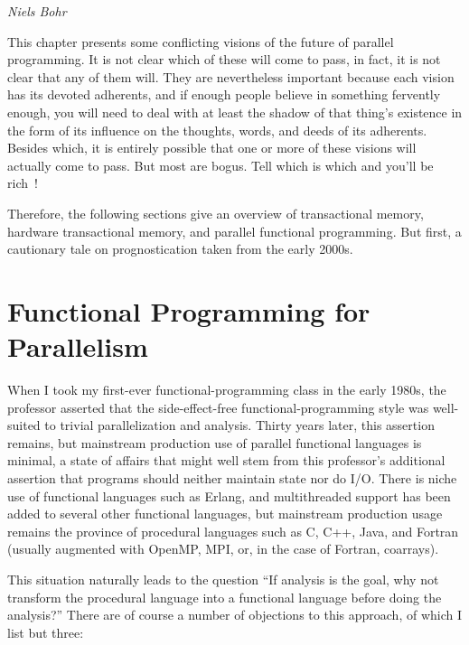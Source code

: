 
%
	 {\emph{Niels Bohr}}

This chapter presents some conflicting visions of the future of parallel
programming.
It is not clear which of these will come to pass, in fact, it is not
clear that any of them will.
They are nevertheless important because each vision has its devoted
adherents, and if enough people believe in something fervently enough,
you will need to deal with at least the shadow of that thing's existence
in the form of its
influence on the thoughts, words, and deeds of its adherents.
Besides which, it is entirely possible that one or more of these visions
will actually come to pass.
But most are bogus.
Tell which is which and you'll be rich~\cite{KeithRSpitz1977}!

Therefore, the following sections give an overview of transactional
memory, hardware transactional memory, and
parallel functional programming.
But first, a cautionary tale on prognostication taken from the early 2000s.





\section{Functional Programming for Parallelism}
\label{sec:future:Functional Programming for Parallelism}

When I took my first-ever functional-programming class in the early 1980s,
the professor asserted that the side-effect-free functional-programming
style was well-suited to trivial parallelization and analysis.
Thirty years later, this assertion remains, but mainstream production
use of parallel functional languages is minimal, a state of affairs
that might well stem from this professor's additional assertion that
programs should neither maintain state nor do I/O.
There is niche use of functional languages such as Erlang, and
multithreaded support has been added to several other functional languages,
but mainstream production usage remains the province of procedural
languages such as C, C++, Java, and Fortran (usually augmented with
OpenMP, MPI, or, in the case of Fortran, coarrays).

This situation naturally leads to the question ``If analysis is the goal,
why not transform the procedural language into a functional language before
doing the analysis?''
There are of course a number of objections to this approach, of which
I list but three:

